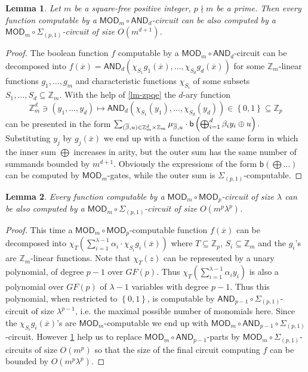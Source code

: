 \documentclass[11pt,a4paper]{amsart}
\newtheorem{lm}{Lemma}[section]
\newcommand{\m}[1]{{\uppercase {\bf{#1}}}}
\newcommand{\set}[1]{{\left\{ {#1} \right\} }}
\newcommand{\ci}{\subseteq}
\renewcommand{\mapsto}{\longmapsto}
\renewcommand{\o}[1]{\overline {#1}}
\newcommand{\z}{\mathbb{Z}}
\renewcommand{\b}{\textsf{b}}
\newcommand{\sumpk}[2]{\Sigma_{(#1,#2)}}
\newcommand{\csize}{\lambda}
\newcommand{\ccand}{\mathsf{AND}}
\newcommand{\ccmod}{\mathsf{MOD}}
\begin{document}
\begin{lm}\label{lm:normal-form}
Let $m$ be a square-free positive integer, $p\nmid m$ be a prime.
Then every function computable by a $\ccmod_m\circ\ccand_d$-circuit
can be also computed by a $\ccmod_m\circ\sumpk{p}{1}$-circuit of size $O(m^{d+1})$.
\end{lm}
\begin{proof}
The boolean function $f$ computable by a $\ccmod_m\circ\ccand_d$-circuit can be decomposed into
$f(\o x) = \ccand_d(\chi_{S_1}g_1(\o x),\ldots,\chi_{S_d}g_d(\o x))$
for some $\z_m$-linear functions $g_1,\ldots,g_m$ and characteristic functions $\chi_{S_i}$
of some subsets $S_1,\ldots,S_d \ci \z_m$.
With the help of \cref{lm-zpqe} the $d$-ary function
\[
\z_m^d \ni (y_1,\ldots,y_d) \mapsto
\ccand_d(\chi_{S_1}(y_1),\ldots,\chi_{S_d}(y_d))\in \set{0,1}\ci\z_p
\]
can be presented in the form
\(
\sum_{(\o\beta,u)\in\m \z_m^d\times\z_m}
\mu_{\o\beta,u}\cdot \b\left(\bigoplus_{i=1}^d \beta_i y_i\oplus u\right).
\)
Substituting $y_j$ by $g_j(\o x)$ we end up with a function of the same form
in which the inner sum $\bigoplus$ increases in arity,
but the outer sum has the same number of summands bounded by $m^{d+1}$.
Obviously the expressions of the form $\b\left(\bigoplus \ldots\right)$
can be computed by $\ccmod_m$-gates,
while the outer sum is $\sumpk{p}{1}$-computable.
\end{proof}


\begin{lm}
\label{lm:unmod}
Every function computable by a $\ccmod_m\circ\ccmod_p$-circuit of size $\csize$
can be also computed by a $\ccmod_m\circ\sumpk{p}{1}$-circuit of size $O(m^p\csize^p)$.
\end{lm}
\begin{proof}
This time a $\ccmod_m\circ\ccmod_p$-computable function $f(\o x)$ can be decomposed into\break
\(
\chi_T\left(\sum_{i=1}^{\csize-1} \alpha_i\cdot\chi_{S_i}g_i(\o x)\right)
\)
where $T\ci\z_p$, $S_i\ci\z_m$ and the $g_i$'s are $\z_m$-linear functions.
Note that $\chi_T(z)$ can be represented by a unary polynomial, of degree $p-1$ over $GF(p)$.
Thus
\(
\chi_T\left(\sum_{i=1}^{\csize-1} \alpha_i y_i\right)
\)
is also a polynomial over $GF(p)$ of $\csize-1$ variables with degree $p-1$.
Thus this polynomial, when restricted to $\set{0,1}$, is computable by
$\ccand_{p-1}\circ\sumpk{p}{1}$-circuit of size $\csize^{p-1}$,
i.e. the maximal possible number of monomials here.
Since the $\chi_{S_i}g_i(\o x)$'s are $\ccmod_m$-computable
we end up with $\ccmod_m\circ\ccand_{p-1}\circ\sumpk{p}{1}$-circuit.
However \cref{lm:normal-form} help us to replace $\ccmod_m\circ\ccand_{p-1}$-parts
by $\ccmod_m\circ\sumpk{p}{1}$-circuits of size $O(m^p)$
so that the size of the final circuit computing $f$ can be bounded by $O(m^p\csize^p)$.
\end{proof}
\end{document}
